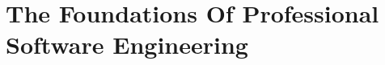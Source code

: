 \chapter{The Foundations Of Professional Software Engineering}

\etocsettocstyle{\section*{\contentsname}\par}{}
\localtableofcontents
















